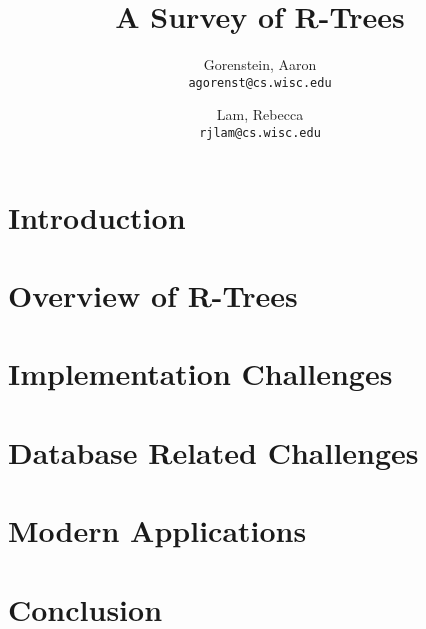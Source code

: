 \documentclass[10pt, twocolumn, draft]{article}
\title{A Survey of R-Trees}
\author{
	Gorenstein, Aaron\\
	\texttt{agorenst@cs.wisc.edu}
	\and
	Lam, Rebecca\\
	\texttt{rjlam@cs.wisc.edu}
}
\begin{document}
\maketitle
\thispagestyle{empty}



\section{Introduction}
\label{sec:intro}


\section{Overview of R-Trees}
\label{sec:overview}


\section{Implementation Challenges}
\label{sec:impchal}


\section{Database Related Challenges}
\label{sec:dbchal}


\section{Modern Applications}
\label{sec:apps}


\section{Conclusion}
\label{sec:conc}


%
%
\end{document}

